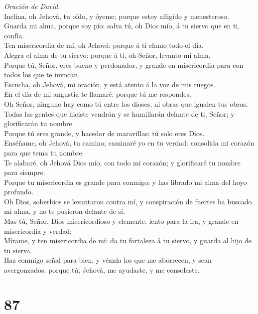  \emph{Oración de David.}\\
Inclina, oh Jehová, tu oído, y óyeme; porque estoy afligido y
menesteroso.\\
 Guarda mi alma, porque soy pío: salva tú, oh Dios mío, á tu
siervo que en ti, confía.\\
 Ten misericordia de mí, oh Jehová: porque á ti clamo todo
el día.\\
 Alegra el alma de tu siervo: porque á ti, oh Señor, levanto
mi alma.\\
 Porque tú, Señor, eres bueno y perdonador, y grande en
misericordia para con todos los que te invocan.\\
 Escucha, oh Jehová, mi oración, y está atento á la voz de
mis ruegos.\\
 En el día de mi angustia te llamaré: porque tú me
respondes.\\
 Oh Señor, ninguno hay como tú entre los dioses, ni obras
que igualen tus obras.\\
 Todas las gentes que hiciste vendrán y se humillarán
delante de ti, Señor; y glorificarán tu nombre.\\
 Porque tú eres grande, y hacedor de maravillas: tú solo
eres Dios.\\
 Enséñame, oh Jehová, tu camino; caminaré yo en tu verdad:
consolida mi corazón para que tema tu nombre.\\
 Te alabaré, oh Jehová Dios mío, con todo mi corazón; y
glorificaré tu nombre para siempre.\\
 Porque tu misericordia es grande para conmigo; y has
librado mi alma del hoyo profundo.\\
 Oh Dios, soberbios se levantaron contra mí, y conspiración
de fuertes ha buscado mi alma, y no te pusieron delante de sí.\\
 Mas tú, Señor, Dios misericordioso y clemente, lento para
la ira, y grande en misericordia y verdad;\\
 Mírame, y ten misericordia de mí: da tu fortaleza á tu
siervo, y guarda al hijo de tu sierva.\\
 Haz conmigo señal para bien, y véanla los que me
aborrecen, y sean avergonzados; porque tú, Jehová, me ayudaste, y me
consolaste.

\hypertarget{section-86}{%
\section{87}\label{section-86}}

